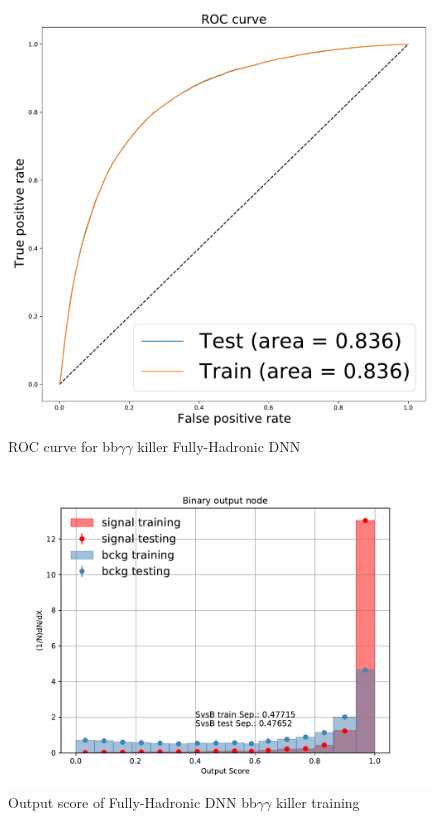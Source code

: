 \begin{figure}[!htbp]
    \centering
    \includegraphics[scale=0.4]{Sections/HHWWgg/images/FH_DNN/EFT/HHWWyyDNN_binary_BBggAsSignal_E500_B250_BalanceYields/ROC.pdf}%
    \caption{ROC curve for bb$\gamma \gamma$ killer Fully-Hadronic DNN}
    \label{fig:FH_DNN_ROC_bbgg}
\end{figure}

\begin{figure}[!htbp]
\centering
\includegraphics[scale=0.6]{Sections/HHWWgg/images/FH_DNN/EFT/HHWWyyDNN_binary_BBggAsSignal_E500_B250_BalanceYields/overfitting_plot_BinaryClassifier_Binary.pdf}%
\caption{Output score of Fully-Hadronic DNN bb$\gamma \gamma$ killer training}
\label{fig:FH_DNN_OutputScore_bbgg}
\end{figure}

